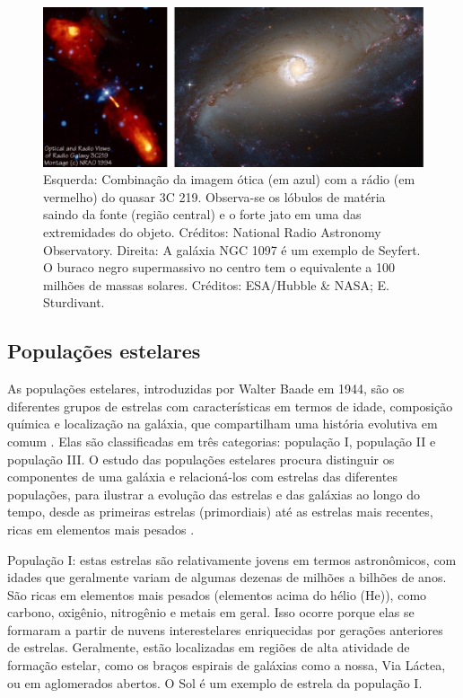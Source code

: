 \begin{figure}[!h] 
  \centering 
  \includegraphics[width=1.0\textwidth]{Imagens/agns.png} 
  \caption[Exemplos de galáxias com núcleo ativo.]{Esquerda: Combinação da imagem ótica (em azul) com a rádio (em vermelho) do quasar 3C 219. Observa-se os lóbulos de matéria saindo da fonte (região central) e o forte jato em uma das extremidades do objeto. Créditos: National Radio Astronomy Observatory. Direita: A galáxia NGC 1097 é um exemplo de Seyfert. O buraco negro supermassivo no centro tem o equivalente a 100 milhões de massas solares. Créditos: ESA/Hubble \& NASA; E. Sturdivant.}
  \label{fig:} 
\end{figure}

\subsection{Populações estelares}

As populações estelares, introduzidas por Walter Baade em 1944, são os diferentes grupos de estrelas com características em termos de idade, composição química e localização na galáxia, que compartilham uma história evolutiva em comum \cite{2010arnab}. Elas são classificadas em três categorias: população I, população II e população III. O estudo das populações estelares procura distinguir os componentes de uma galáxia e relacioná-los com estrelas das diferentes populações, para ilustrar a evolução das estrelas e das galáxias ao longo do tempo, desde as primeiras estrelas (primordiais) até as estrelas mais recentes, ricas em elementos mais pesados \cite{2023Kepler}.

População I: estas estrelas são relativamente jovens em termos astronômicos, com idades que geralmente variam de algumas dezenas de milhões a bilhões de anos. São ricas em elementos mais pesados (elementos acima do hélio (He)), como carbono, oxigênio, nitrogênio e metais em geral. Isso ocorre porque elas se formaram a partir de nuvens interestelares enriquecidas por gerações anteriores de estrelas. Geralmente, estão localizadas em regiões de alta atividade de formação estelar, como os braços espirais de galáxias como a nossa, Via Láctea, ou em aglomerados abertos. O Sol é um exemplo de estrela da população I.

